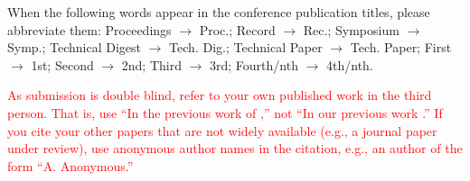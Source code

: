 \documentclass{article}
\begin{document}
When the following words appear in the conference publication titles, please abbreviate them: Proceedings $\rightarrow$ Proc.; Record $\rightarrow$ Rec.; Symposium $\rightarrow$ Symp.; Technical Digest $\rightarrow$ Tech. Dig.; Technical Paper $\rightarrow$ Tech. Paper; First $\rightarrow$ 1st; Second $\rightarrow$ 2nd; Third $\rightarrow$ 3rd; Fourth/nth $\rightarrow$ 4th/nth.

\textcolor{red}{As submission is double blind, refer to your own published work in the third person. That is, use ``In the previous work of \cite{Someone:10},'' not ``In our previous work \cite{Someone:10}.'' If you cite your other papers that are not widely available (e.g., a journal paper under review), use anonymous author names in the citation, e.g., an author of the form ``A. Anonymous.''}



%
%
%
%
\end{document}
